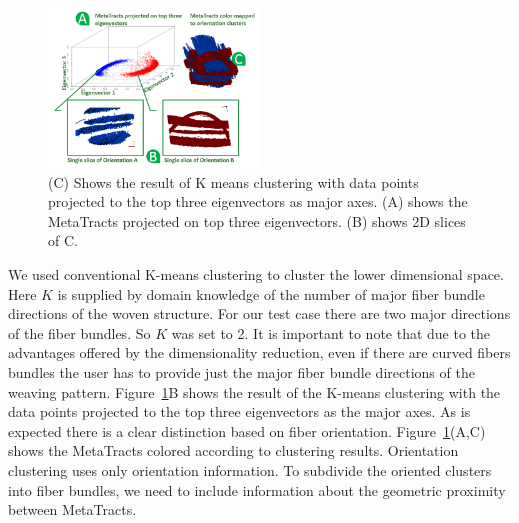   
  \begin{figure}
  \centering
%  	
 \includegraphics[width=0.5\textwidth]{imagesMT2014/crop-16/orientation_cluster.PNG}
  	\caption{(C) Shows the result of K means clustering with data points projected to the top three eigenvectors as major axes. (A) shows the MetaTracts projected on top three eigenvectors. (B) shows 2D slices of C. }
  \label{fig:orientation_clustering}
  \end{figure}
  
   We used conventional K-means clustering to cluster the lower dimensional space. Here $K$ is supplied by domain knowledge of the number of major fiber bundle directions of the woven structure.
For our test case there are two major directions of the fiber bundles. So $K$ was set to 2. It is important to note that due to the advantages offered by the dimensionality reduction, even if there are curved fibers bundles the user has to provide just the major fiber bundle directions of the weaving pattern. Figure~\ref{fig:orientation_clustering}B shows the result of the K-means clustering with the data points projected to the top three eigenvectors as the major axes. As is expected there is a clear distinction based on fiber orientation. Figure~\ref{fig:orientation_clustering}(A,C) shows the MetaTracts colored according to clustering results.
Orientation clustering uses only orientation information. To subdivide the oriented clusters into fiber bundles,
we need to include information about the geometric proximity between MetaTracts.


